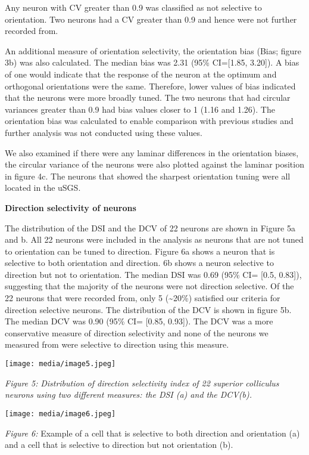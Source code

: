 Any neuron with CV greater than 0.9 was classified as not selective to
orientation. Two neurons had a CV greater than 0.9 and hence were not
further recorded from.

An additional measure of orientation selectivity, the orientation bias
(Bias; figure 3b) was also calculated. The median bias was 2.31 (95\%
CI={[}1.85, 3.20{]}). A bias of one would indicate that the response of
the neuron at the optimum and orthogonal orientations were the same.
Therefore, lower values of bias indicated that the neurons were more
broadly tuned. The two neurons that had circular variances greater than
0.9 had bias values closer to 1 (1.16 and 1.26). The orientation bias
was calculated to enable comparison with previous studies and further
analysis was not conducted using these values.

We also examined if there were any laminar differences in the
orientation biases, the circular variance of the neurons were also
plotted against the laminar position in figure 4c. The neurons that
showed the sharpest orientation tuning were all located in the uSGS.

\textbf{Direction selectivity of neurons}

The distribution of the DSI and the DCV of 22 neurons are shown in
Figure 5a and b. All 22 neurons were included in the analysis as neurons
that are not tuned to orientation can be tuned to direction. Figure 6a
shows a neuron that is selective to both orientation and direction. 6b
shows a neuron selective to direction but not to orientation. The median
DSI was 0.69 (95\% CI= {[}0.5, 0.83{]}), suggesting that the majority of
the neurons were not direction selective. Of the 22 neurons that were
recorded from, only 5 (\textasciitilde{}20\%) satisfied our criteria for
direction selective neurons. The distribution of the DCV is shown in
figure 5b. The median DCV was 0.90 (95\% CI= {[}0.85, 0.93{]}). The DCV
was a more conservative measure of direction selectivity and none of the
neurons we measured from were selective to direction using this measure.

\texttt{[image: media/image5.jpeg]}

\emph{Figure 5:} \emph{Distribution of direction selectivity index of 22
superior colliculus neurons using two different measures: the DSI (a)
and the DCV(b).}

\texttt{[image: media/image6.jpeg]}

\emph{Figure 6:} Example of a cell that is selective to both direction
and orientation (a) and a cell that is selective to direction but not
orientation (b).

